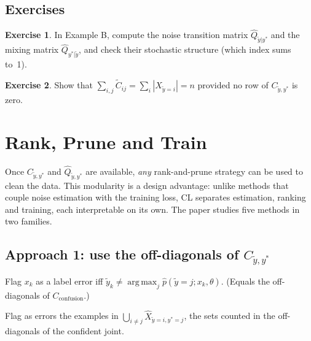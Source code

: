 \documentclass[11pt,a4paper]{report}
\newcommand{\Cyy}{C_{\tilde y,y^*}}
\newcommand{\Cconf}{C_{\text{confusion}}}
\newcommand{\argmax}{\operatorname*{arg\,max}}
\newcommand{\1}{\mathbf 1}
\theoremstyle{definition}
\newtheorem{exercise}{Exercise}[chapter]
\theoremstyle{plain}
\theoremstyle{remark}
\begin{document}
\section*{Exercises}
\begin{exercise}
In Example B, compute the noise transition matrix $\hat Q_{\tilde y|y^*}$ and the mixing matrix $\hat Q_{y^*|\tilde y}$, and check their stochastic structure (which index sums to~1).
\end{exercise}
\begin{exercise}
Show that $\sum_{i,j}\tilde C_{ij}=\sum_i|X_{\tilde y=i}|=n$ provided no row of $\Cyy$ is zero.
\end{exercise}

\chapter{Rank, Prune and Train}

Once $\Cyy$ and $\hat Q_{\tilde y,y^*}$ are available, \emph{any} rank-and-prune strategy can be used to clean the data. This modularity is a design advantage: unlike methods that couple noise estimation with the training loss, CL separates estimation, ranking and training, each interpretable on its own. The paper studies five methods in two families.

\section{Approach 1: use the off-diagonals of $\Cyy$}
\begin{description}[leftmargin=1.5cm,style=nextline]
\item[Baseline 1: $\Cconf$.] Flag $x_k$ as a label error iff $\tilde y_k\ne\argmax_{j}\hat p(\tilde y=j;x_k,\theta)$. (Equals the off-diagonals of $\Cconf$.)
\item[Method 2: $\Cyy$.] Flag as errors the examples in $\bigcup_{i\ne j}\hat X_{\tilde y=i,y^*=j}$, the sets counted in the off-diagonals of the confident joint.
\end{description}
\end{document}
